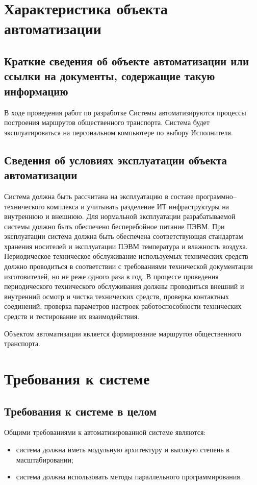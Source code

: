\chapter{Характеристика объекта автоматизации}
\section{Краткие сведения об объекте автоматизации или ссылки на документы, содержащие такую информацию}
В ходе проведения работ по разработке Системы автоматизируются процессы построения маршрутов общественного 
транспорта. Система будет эксплуатироваться на персональном компьютере по выбору Исполнителя.

\section{Сведения об условиях эксплуатации объекта автоматизации}
Система должна быть рассчитана на эксплуатацию в составе программно–технического комплекса и учитывать 
разделение ИТ инфраструктуры на внутреннюю и внешнюю. Для нормальной эксплуатации разрабатываемой системы 
должно быть обеспечено бесперебойное питание ПЭВМ. При эксплуатации система должна быть обеспечена 
соответствующая стандартам хранения носителей и эксплуатации ПЭВМ температура и влажность воздуха. 
Периодическое техническое обслуживание используемых технических средств должно проводиться в соответствии 
с требованиями технической документации изготовителей, но не реже одного раза в год. В процессе проведения 
периодического технического обслуживания должны проводиться внешний и внутренний осмотр и чистка 
технических средств, проверка контактных соединений, проверка параметров настроек работоспособности 
технических средств и тестирование их взаимодействия.

Объектом автоматизации является формирование маршрутов общественного транспорта.

\chapter{Требования к системе}
\section{Требования к системе в целом}
Общими требованиями к автоматизированной системе являются:
\begin{itemize}
    \item система должна иметь модульную архитектуру и высокую степень в масштабировании;
    \item система должна использовать методы параллельного программирования.
\end{itemize}

